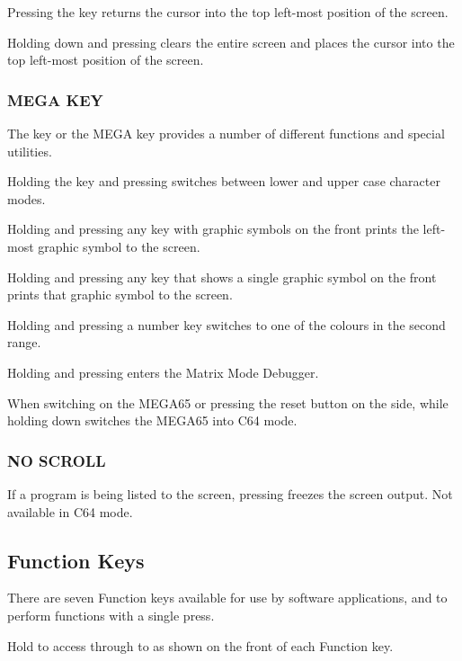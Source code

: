 Pressing the  key returns the cursor into the top left-most position of the screen.

Holding down  and pressing  clears the entire screen and places the cursor into the top left-most position of the screen.

\subsubsection{MEGA KEY}

The \megasymbolkey key or the MEGA key provides a number of different functions and special utilities.

Holding the  key and pressing \megasymbolkey switches between lower and upper case character modes.

Holding \megasymbolkey and pressing any key with graphic symbols on the front prints the left-most graphic symbol to the screen.

Holding \megasymbolkey and pressing any key that shows a single graphic symbol on the front prints that graphic symbol to the screen.

Holding \megasymbolkey and pressing a number key switches to one of the colours in the second range.

Holding \megasymbolkey and pressing  enters the Matrix Mode Debugger.

When switching on the MEGA65 or pressing the reset button on the side, while holding down \megasymbolkey switches the MEGA65 into C64 mode.

\subsubsection{NO SCROLL}
If a program is being listed to the screen, pressing  freezes the screen output. Not available in C64 mode.


\subsection{Function Keys}

There are seven Function keys available for use by software applications,       and  to perform functions with a single press.

Hold  to access  through to  as shown on the front of each Function key.

